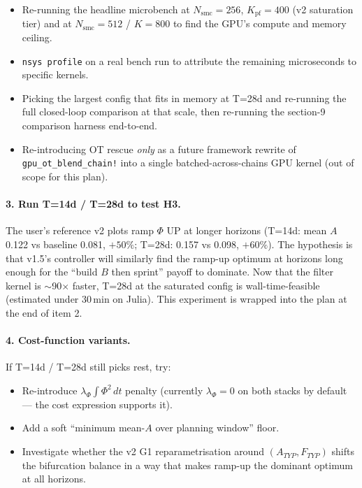 \documentclass[11pt,a4paper]{article}
\begin{document}
\begin{itemize}[itemsep=2pt]
  \item Re-running the headline microbench at $N_{\text{smc}}=256$,
        $K_{\text{pf}}=400$ (v2 saturation tier) and at
        $N_{\text{smc}}=512$ / $K=800$ to find the GPU's compute
        and memory ceiling.
  \item \texttt{nsys profile} on a real bench run to attribute
        the remaining microseconds to specific kernels.
  \item Picking the largest config that fits in memory at T=28d
        and re-running the full closed-loop comparison at that
        scale, then re-running the section-9 comparison harness
        end-to-end.
  \item Re-introducing OT rescue \emph{only} as a future
        framework rewrite of \texttt{gpu\_ot\_blend\_chain!} into
        a single batched-across-chains GPU kernel (out of scope
        for this plan).
\end{itemize}

\paragraph{3. Run T=14d / T=28d to test H3.}
The user's reference v2 plots ramp $\Phi$ UP at longer horizons
(T=14d: mean $A$ 0.122 vs baseline 0.081, $+50\%$; T=28d: 0.157
vs 0.098, $+60\%$). The hypothesis is that v1.5's controller will
similarly find the ramp-up optimum at horizons long enough for
the ``build $B$ then sprint'' payoff to dominate. Now that the
filter kernel is $\sim$90$\times$ faster, T=28d at the saturated
config is wall-time-feasible (estimated under 30\,min on Julia).
This experiment is wrapped into the plan at the end of item 2.

\paragraph{4. Cost-function variants.}
If T=14d / T=28d still picks rest, try:
\begin{itemize}[itemsep=2pt]
  \item Re-introduce $\lambda_\Phi \!\int \Phi^2 \, dt$ penalty
        (currently $\lambda_\Phi = 0$ on both stacks by default
        --- the cost expression supports it).
  \item Add a soft ``minimum mean-$A$ over planning window''
        floor.
  \item Investigate whether the v2 G1 reparametrisation around
        $(A_{TYP}, F_{TYP})$ shifts the bifurcation balance in
        a way that makes ramp-up the dominant optimum at all
        horizons.
\end{itemize}
\end{document}
